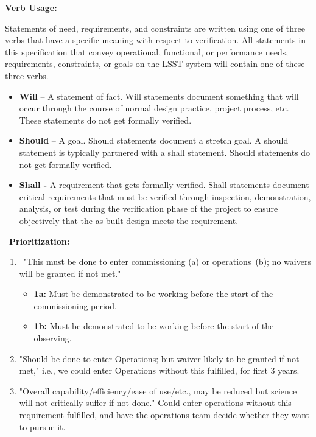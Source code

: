 \documentclass[SE,toc,lsstdraft]{lsstdoc}
\begin{document}
\textbf{Verb Usage:}

Statements of need, requirements, and constraints are written using one of three verbs that have a specific meaning with respect to verification. All statements in this specification that convey operational, functional, or performance needs, requirements, constraints, or goals on the LSST system will contain one of these three verbs.

    \begin{itemize}
\item
\textbf{Will} – A statement of fact. Will statements document something that will occur through the course of normal design practice, project process, etc. These statements do not get formally verified.

\item
\textbf{Should} – A goal. Should statements document a stretch goal. A should statement is typically partnered with a shall statement. Should statements do not get formally verified.

\item
\textbf{Shall - }A requirement that gets formally verified. Shall statements document critical requirements that must be verified through inspection, demonstration, analysis, or test during the verification phase of the project to ensure objectively that the as-built design meets the requirement.

    \end{itemize}

 \textbf{Prioritization:}

    \begin{enumerate}
\item
 "This must be done to enter commissioning (a) or operations (b); no waivers will be granted if not met."
        \begin{itemize}
\item
\textbf{1a:} Must be demonstrated to be working before the start of the commissioning period.

\item
\textbf{1b:} Must be demonstrated to be working before the start of the observing.

        \end{itemize}

\item
"Should be done to enter Operations; but waiver likely to be granted if not met," i.e., we could enter Operations without this fulfilled, for first 3 years.

\item
"Overall capability/efficiency/ease of use/etc., may be reduced but science will not critically suffer if not done." Could enter operations without this requirement fulfilled, and have the operations team decide whether they want to pursue it.

    \end{enumerate}
\end{document}
